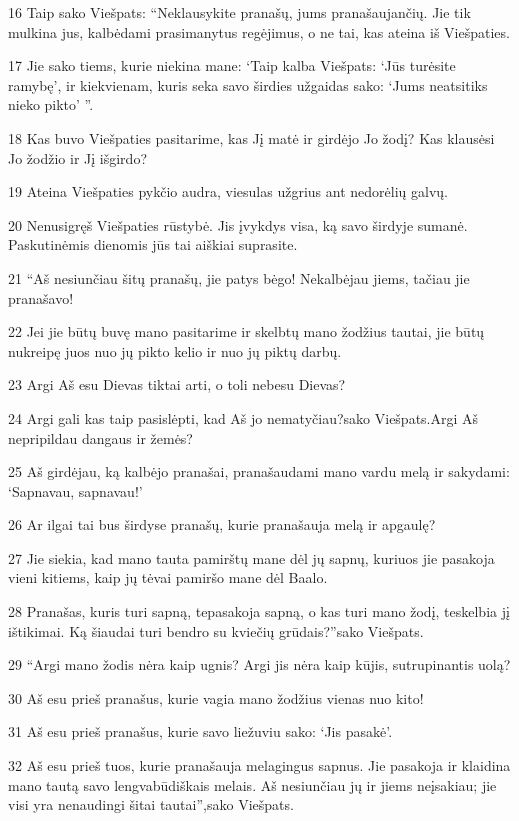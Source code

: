 \par 16 Taip sako Viešpats: “Neklausykite pranašų, jums pranašaujančių. Jie tik mulkina jus, kalbėdami prasimanytus regėjimus, o ne tai, kas ateina iš Viešpaties. 
\par 17 Jie sako tiems, kurie niekina mane: ‘Taip kalba Viešpats: ‘Jūs turėsite ramybę’, ir kiekvienam, kuris seka savo širdies užgaidas sako: ‘Jums neatsitiks nieko pikto’ ”. 
\par 18 Kas buvo Viešpaties pasitarime, kas Jį matė ir girdėjo Jo žodį? Kas klausėsi Jo žodžio ir Jį išgirdo? 
\par 19 Ateina Viešpaties pykčio audra, viesulas užgrius ant nedorėlių galvų. 
\par 20 Nenusigręš Viešpaties rūstybė. Jis įvykdys visa, ką savo širdyje sumanė. Paskutinėmis dienomis jūs tai aiškiai suprasite. 
\par 21 “Aš nesiunčiau šitų pranašų, jie patys bėgo! Nekalbėjau jiems, tačiau jie pranašavo! 
\par 22 Jei jie būtų buvę mano pasitarime ir skelbtų mano žodžius tautai, jie būtų nukreipę juos nuo jų pikto kelio ir nuo jų piktų darbų. 
\par 23 Argi Aš esu Dievas tiktai arti, o toli nebesu Dievas? 
\par 24 Argi gali kas taip pasislėpti, kad Aš jo nematyčiau?­sako Viešpats.­Argi Aš nepripildau dangaus ir žemės? 
\par 25 Aš girdėjau, ką kalbėjo pranašai, pranašaudami mano vardu melą ir sakydami: ‘Sapnavau, sapnavau!’ 
\par 26 Ar ilgai tai bus širdyse pranašų, kurie pranašauja melą ir apgaulę? 
\par 27 Jie siekia, kad mano tauta pamirštų mane dėl jų sapnų, kuriuos jie pasakoja vieni kitiems, kaip jų tėvai pamiršo mane dėl Baalo. 
\par 28 Pranašas, kuris turi sapną, tepasakoja sapną, o kas turi mano žodį, teskelbia jį ištikimai. Ką šiaudai turi bendro su kviečių grūdais?”­sako Viešpats. 
\par 29 “Argi mano žodis nėra kaip ugnis? Argi jis nėra kaip kūjis, sutrupinantis uolą? 
\par 30 Aš esu prieš pranašus, kurie vagia mano žodžius vienas nuo kito! 
\par 31 Aš esu prieš pranašus, kurie savo liežuviu sako: ‘Jis pasakė’. 
\par 32 Aš esu prieš tuos, kurie pranašauja melagingus sapnus. Jie pasakoja ir klaidina mano tautą savo lengvabūdiškais melais. Aš nesiunčiau jų ir jiems neįsakiau; jie visi yra nenaudingi šitai tautai”,­sako Viešpats. 
